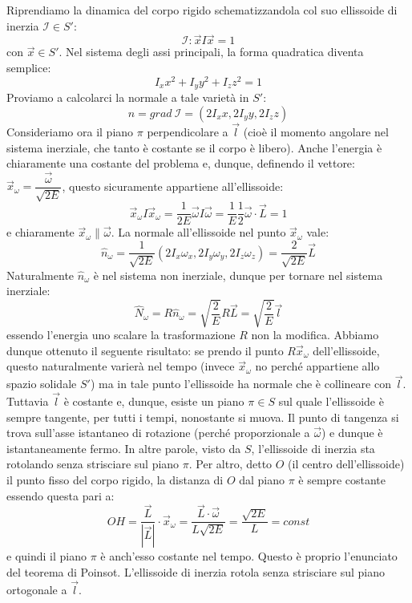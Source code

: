 \documentclass[a4paper,openany]{article}
\begin{document}
	Riprendiamo la dinamica del corpo rigido schematizzandola col suo ellissoide di inerzia $\mathcal{I}\in S'$:
	$$
	\mathcal{I} : \vec{x}I\vec{x} = 1
	$$
	con $\vec{x}\in S'$. Nel sistema degli assi principali, la forma quadratica diventa semplice:
	$$
	I_x x^2 + I_y y^2 + I_z z^2  = 1
	$$
	Proviamo a calcolarci la normale a tale varietà in $S'$:
	$$
	\hat{n} = grad\>\mathcal{I} = (2I_x x,2I_y y,2I_z z)
	$$
	Consideriamo ora il piano $\pi$ perpendicolare a $\vec{l}$ (cioè il momento angolare nel sistema inerziale, che tanto è costante se il corpo è libero). Anche l'energia è chiaramente una costante del problema e, dunque, definendo il vettore:
	$\vec{x}_{\omega} = \dfrac{\vec{\omega}}{\sqrt{2E}} $, questo sicuramente appartiene all'ellissoide:
	$$
	\vec{x}_{\omega}I\vec{x}_{\omega} = \dfrac{1}{2E} \vec{\omega}I\vec{\omega} = \dfrac{1}{E} \dfrac{1}{2}\vec{\omega}\cdot\vec{L} = 1
	$$
	e chiaramente $\vec{x}_{\omega} \parallel \vec{\omega}$. La normale all'ellissoide nel punto $\vec{x}_{\omega}$ vale:
	$$
	\hat{n}_{\omega} =\dfrac{1}{\sqrt{2E}} (2I_x \omega_{x},2I_y \omega_y,2I_z \omega_z) = \dfrac{2}{\sqrt{2E}}\vec{L}
	$$
	Naturalmente $\hat{n}_{\omega}$ è nel sistema non inerziale, dunque per tornare nel sistema inerziale:
	$$
	\hat{N}_{\omega} = R\hat{n}_{\omega} =\sqrt{\dfrac{2}{E}}R\vec{L} = \sqrt{\dfrac{2}{E}}\vec{l}
	$$
	essendo l'energia uno scalare la trasformazione $R$ non la modifica. Abbiamo dunque ottenuto il seguente risultato: se prendo il punto $R\vec{x}_{\omega}$ dell'ellissoide, questo naturalmente varierà nel tempo (invece $\vec{x}_{\omega}$ no perché appartiene allo spazio solidale $S'$) ma in tale punto l'ellissoide ha normale che è collineare con $\vec{l}$. Tuttavia $\vec{l}$ è costante e, dunque, esiste un piano $\pi \in S$ sul quale l'ellissoide è sempre tangente, per tutti i tempi, nonostante si muova. Il punto di tangenza si trova sull'asse istantaneo di rotazione (perché proporzionale a $\vec{\omega}$) e dunque è istantaneamente fermo. In altre parole, visto da $S$, l'ellissoide di inerzia sta rotolando senza strisciare sul piano $\pi$. Per altro, detto $O$ (il centro dell'ellissoide) il punto fisso del corpo rigido, la distanza di $O$ dal piano $\pi$ è sempre costante essendo questa pari a:
	$$
	OH = \dfrac{\vec{L}}{|\vec{L}|}\cdot\vec{x}_{\omega} = \dfrac{\vec{L}\cdot\vec{\omega}}{L\sqrt{2E}} = \dfrac{\sqrt{2E}}{L} = const
	$$
	e quindi il piano $\pi$ è anch'esso costante nel tempo.
	Questo è proprio l'enunciato del teorema di Poinsot. L'ellissoide di inerzia rotola senza strisciare sul piano ortogonale a $\vec{l}$.
\end{document}
